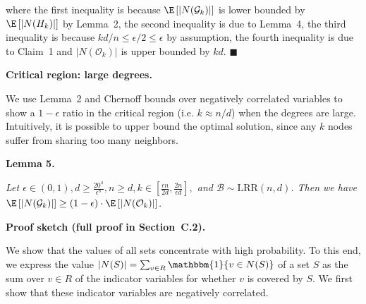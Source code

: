 where the first inequality is because $\E\left[|N(\mathcal{G}_{k})|\right]$ is lower bounded by $\E\left[|N(H_{k})|\right]$ by Lemma 2, the second inequality is due to Lemma 4, the third inequality is because $kd/n\leq\epsilon/2\leq\epsilon$ by assumption, the fourth inequality is due to Claim 1 and $|N(\mathcal{O}_{k})|$ is upper bounded by $kd$.
\ensuremath{\blacksquare}\par






\par\medskip\noindent\textbf{Critical region: large degrees.}\par




We use Lemma 2 and Chernoff bounds over negatively correlated variables to show a $1-\epsilon$ ratio in the critical region (i.e. $k\approx n/d$) when the degrees are large.
Intuitively, it is possible to upper bound the optimal solution, since any $k$ nodes suffer from sharing too many neighbors.\par





\par\medskip\noindent\textbf{\textbf{Lemma 5}\textbf{.}}\par



\emph{Let $\epsilon\in(0,1),d\geq\frac{20^{4}}{\epsilon^{8}},n\geq d,k\in\left[\frac{\epsilon n}{2d},\frac{2n}{\epsilon d}\right],$ and $\mathcal{B}\sim\text{{LRR}}(n,d)$.
Then we have $\E\left[|N(\mathcal{G}_{k})|\right]\geq\left(1-\epsilon\right)\cdot\E\left[|N(\mathcal{O}_{k})|\right]$.}\par






\par\medskip\noindent\textbf{Proof sketch (full proof in Section C.2).}\par



We show that the values of all sets concentrate with high probability. To this end, we express the value $|N(S)|=\sum_{v\in R}\mathbbm{1}\{v\in N(S)\}$ of a set $S$ as the sum over $v\in R$ of the indicator variables for whether $v$ is covered by $S$. We first show that these indicator variables are negatively correlated.\par




